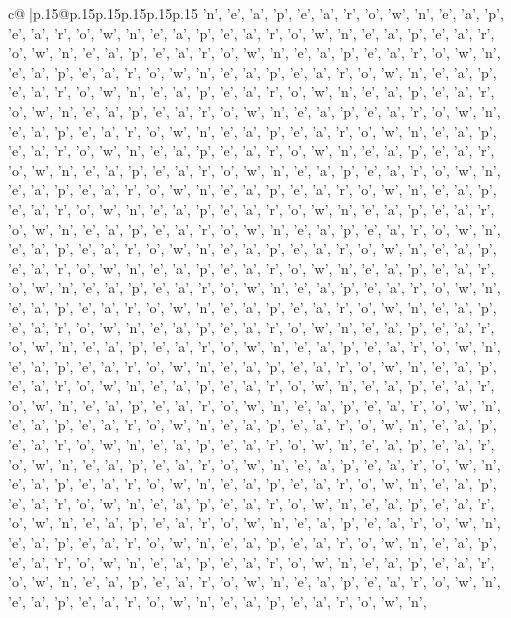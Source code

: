 \documentclass{article}
\begin{document}
{\begin{supertabular}{c@{$\;$}|p{.15\linewidth}@{}p{.15\linewidth}p{.15\linewidth}p{.15\linewidth}p{.15\linewidth}p{.15\linewidth}}
{{{'n', 'e', 'a', 'p', 'e', 'a', 'r', 'o', 'w', 'n', 'e', 'a', 'p', 'e', 'a', 'r', 'o', 'w', 'n', 'e', 'a', 'p', 'e', 'a', 'r', 'o', 'w', 'n', 'e', 'a', 'p', 'e', 'a', 'r', 'o', 'w', 'n', 'e', 'a', 'p', 'e', 'a', 'r', 'o', 'w', 'n', 'e', 'a', 'p', 'e', 'a', 'r', 'o', 'w', 'n', 'e', 'a', 'p', 'e', 'a', 'r', 'o', 'w', 'n', 'e', 'a', 'p', 'e', 'a', 'r', 'o', 'w', 'n', 'e', 'a', 'p', 'e', 'a', 'r', 'o', 'w', 'n', 'e', 'a', 'p', 'e', 'a', 'r', 'o', 'w', 'n', 'e', 'a', 'p', 'e', 'a', 'r', 'o', 'w', 'n', 'e', 'a', 'p', 'e', 'a', 'r', 'o', 'w', 'n', 'e', 'a', 'p', 'e', 'a', 'r', 'o', 'w', 'n', 'e', 'a', 'p', 'e', 'a', 'r', 'o', 'w', 'n', 'e', 'a', 'p', 'e', 'a', 'r', 'o', 'w', 'n', 'e', 'a', 'p', 'e', 'a', 'r', 'o', 'w', 'n', 'e', 'a', 'p', 'e', 'a', 'r', 'o', 'w', 'n', 'e', 'a', 'p', 'e', 'a', 'r', 'o', 'w', 'n', 'e', 'a', 'p', 'e', 'a', 'r', 'o', 'w', 'n', 'e', 'a', 'p', 'e', 'a', 'r', 'o', 'w', 'n', 'e', 'a', 'p', 'e', 'a', 'r', 'o', 'w', 'n', 'e', 'a', 'p', 'e', 'a', 'r', 'o', 'w', 'n', 'e', 'a', 'p', 'e', 'a', 'r', 'o', 'w', 'n', 'e', 'a', 'p', 'e', 'a', 'r', 'o', 'w', 'n', 'e', 'a', 'p', 'e', 'a', 'r', 'o', 'w', 'n', 'e', 'a', 'p', 'e', 'a', 'r', 'o', 'w', 'n', 'e', 'a', 'p', 'e', 'a', 'r', 'o', 'w', 'n', 'e', 'a', 'p', 'e', 'a', 'r', 'o', 'w', 'n', 'e', 'a', 'p', 'e', 'a', 'r', 'o', 'w', 'n', 'e', 'a', 'p', 'e', 'a', 'r', 'o', 'w', 'n', 'e', 'a', 'p', 'e', 'a', 'r', 'o', 'w', 'n', 'e', 'a', 'p', 'e', 'a', 'r', 'o', 'w', 'n', 'e', 'a', 'p', 'e', 'a', 'r', 'o', 'w', 'n', 'e', 'a', 'p', 'e', 'a', 'r', 'o', 'w', 'n', 'e', 'a', 'p', 'e', 'a', 'r', 'o', 'w', 'n', 'e', 'a', 'p', 'e', 'a', 'r', 'o', 'w', 'n', 'e', 'a', 'p', 'e', 'a', 'r', 'o', 'w', 'n', 'e', 'a', 'p', 'e', 'a', 'r', 'o', 'w', 'n', 'e', 'a', 'p', 'e', 'a', 'r', 'o', 'w', 'n', 'e', 'a', 'p', 'e', 'a', 'r', 'o', 'w', 'n', 'e', 'a', 'p', 'e', 'a', 'r', 'o', 'w', 'n', 'e', 'a', 'p', 'e', 'a', 'r', 'o', 'w', 'n', 'e', 'a', 'p', 'e', 'a', 'r', 'o', 'w', 'n', 'e', 'a', 'p', 'e', 'a', 'r', 'o', 'w', 'n', 'e', 'a', 'p', 'e', 'a', 'r', 'o', 'w', 'n', 'e', 'a', 'p', 'e', 'a', 'r', 'o', 'w', 'n', 'e', 'a', 'p', 'e', 'a', 'r', 'o', 'w', 'n', 'e', 'a', 'p', 'e', 'a', 'r', 'o', 'w', 'n', 'e', 'a', 'p', 'e', 'a', 'r', 'o', 'w', 'n', 'e', 'a', 'p', 'e', 'a', 'r', 'o', 'w', 'n', 'e', 'a', 'p', 'e', 'a', 'r', 'o', 'w', 'n', 'e', 'a', 'p', 'e', 'a', 'r', 'o', 'w', 'n', 'e', 'a', 'p', 'e', 'a', 'r', 'o', 'w', 'n', 'e', 'a', 'p', 'e', 'a', 'r', 'o', 'w', 'n', 'e', 'a', 'p', 'e', 'a', 'r', 'o', 'w', 'n', 'e', 'a', 'p', 'e', 'a', 'r', 'o', 'w', 'n', 'e', 'a', 'p', 'e', 'a', 'r', 'o', 'w', 'n', 'e', 'a', 'p', 'e', 'a', 'r', 'o', 'w', 'n', 'e', 'a', 'p', 'e', 'a', 'r', 'o', 'w', 'n', 'e', 'a', 'p', 'e', 'a', 'r', 'o', 'w', 'n', 'e', 'a', 'p', 'e', 'a', 'r', 'o', 'w', 'n', 'e', 'a', 'p', 'e', 'a', 'r', 'o', 'w', 'n', 'e', 'a', 'p', 'e', 'a', 'r', 'o', 'w', 'n', 'e', 'a', 'p', 'e', 'a', 'r', 'o', 'w', 'n', 'e', 'a', 'p', 'e', 'a', 'r', 'o', 'w', 'n', 'e', 'a', 'p', 'e', 'a', 'r', 'o', 'w', 'n', 'e', 'a', 'p', 'e', 'a', 'r', 'o', 'w', 'n', 'e', 'a', 'p', 'e', 'a', 'r', 'o', 'w', 'n', 'e', 'a', 'p', 'e', 'a', 'r', 'o', 'w', 'n', 'e', 'a', 'p', 'e', 'a', 'r', 'o', 'w', 'n', 'e', 'a', 'p', 'e', 'a', 'r', 'o', 'w', 'n', }}}
\end{supertabular}}
\end{document}
